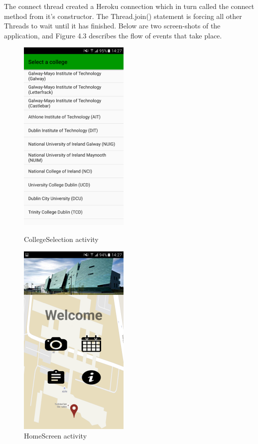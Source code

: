 The connect thread created a Heroku connection which in turn called the connect method from it's constructor. The Thread.join() statement is forcing all other Threads to wait until it has finished. Below are two screen-shots of the application, and Figure 4.3 describes the flow of events that take place.

\begin{figure}[!b]
	\begin{minipage}[b]{0.47\textwidth}
		\includegraphics{img/collegeselection.png}
		\caption{CollegeSelection activity}
	\end{minipage}
	\hfill
	\begin{minipage}[b]{0.47\textwidth}
		\includegraphics{img/homescreen.png}
		\caption{HomeScreen activity}
	\end{minipage}
\end{figure}

